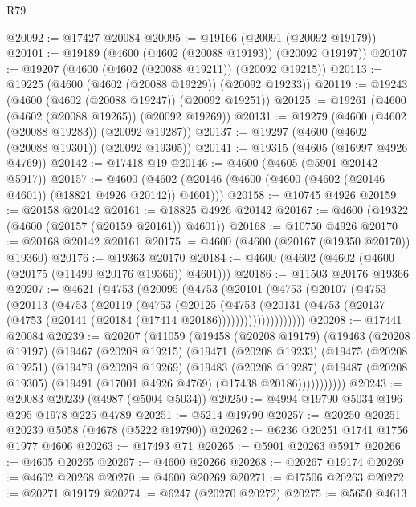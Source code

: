 \begin{lexlean}{R79}
\begin{coremodule}
@20092 := @17427 @20084
@20095 := @19166 (@20091 (@20092 @19179))
@20101 := @19189 (@4600 (@4602 (@20088 @19193)) (@20092 @19197))
@20107 := @19207 (@4600 (@4602 (@20088 @19211)) (@20092 @19215))
@20113 := @19225 (@4600 (@4602 (@20088 @19229)) (@20092 @19233))
@20119 := @19243 (@4600 (@4602 (@20088 @19247)) (@20092 @19251))
@20125 := @19261 (@4600 (@4602 (@20088 @19265)) (@20092 @19269))
@20131 := @19279 (@4600 (@4602 (@20088 @19283)) (@20092 @19287))
@20137 := @19297 (@4600 (@4602 (@20088 @19301)) (@20092 @19305))
@20141 := @19315 (@4605 (@16997 @4926 @4769))
@20142 := @17418 @19
@20146 := @4600 (@4605 (@5901 @20142 @5917))
@20157 := @4600 (@4602 (@20146 (@4600 (@4600 (@4602 (@20146 @4601)) (@18821 @4926 @20142)) @4601)))
@20158 := @10745 @4926
@20159 := @20158 @20142
@20161 := @18825 @4926 @20142
@20167 := @4600 (@19322 (@4600 (@20157 (@20159 @20161)) @4601))
@20168 := @10750 @4926
@20170 := @20168 @20142 @20161
@20175 := @4600 (@4600 (@20167 (@19350 @20170)) @19360)
@20176 := @19363 @20170
@20184 := @4600 (@4602 (@4602 (@4600 (@20175 (@11499 @20176 @19366)) @4601)))
@20186 := @11503 @20176 @19366
@20207 := @4621
    (@4753
      (@20095
        (@4753
          (@20101
            (@4753
              (@20107
                (@4753
                  (@20113
                    (@4753
                      (@20119
                        (@4753
                          (@20125
                            (@4753
                              (@20131
                                (@4753
                                  (@20137 (@4753 (@20141 (@20184 (@17414 @20186))))))))))))))))))))
@20208 := @17441 @20084
@20239 := @20207
    (@11059
      (@19458
        (@20208 @19179)
        (@19463
          (@20208 @19197)
          (@19467
            (@20208 @19215)
            (@19471
              (@20208 @19233)
              (@19475
                (@20208 @19251)
                (@19479
                  (@20208 @19269)
                  (@19483
                    (@20208 @19287)
                    (@19487 (@20208 @19305) (@19491 (@17001 @4926 @4769) (@17438 @20186)))))))))))
@20243 := @20083 @20239 (@4987 (@5004 @5034))
@20250 := @4994 @19790 @5034 @196 @295 @1978 @225 @4789
@20251 := @5214 @19790
@20257 := @20250 @20251 @20239 @5058 (@4678 (@5222 @19790))
@20262 := @6236 @20251 @1741 @1756 @1977 @4606
@20263 := @17493 @71
@20265 := @5901 @20263 @5917
@20266 := @4605 @20265
@20267 := @4600 @20266
@20268 := @20267 @19174
@20269 := @4602 @20268
@20270 := @4600 @20269
@20271 := @17506 @20263
@20272 := @20271 @19179
@20274 := @6247 (@20270 @20272)
@20275 := @5650 @4613

\end{coremodule}
\end{lexlean}
